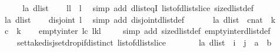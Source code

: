 \begin{isabellebody}
\isanewline
{}\isamarkupfalse%
%
\isadelimproof
\ %
\endisadelimproof
%
\isatagproof
{}\isamarkupfalse%
\isanewline
\ \ \isamarkupfalse%
\ l{\isacharcolon}{\isacharcolon}{\isachardoublequoteopen}{\isacharprime}a\ dlist{\isachardoublequoteclose}\isanewline
\ \ \isamarkupfalse%
\ {\isachardoublequoteopen}l{\isasymdagger}{}{\isachardot}{\isachardot}{\isacharparenleft}{\isacharhash}l{\isacharparenright}\ {\isacharequal}\ l{\isachardoublequoteclose}\ \isamarkupfalse%
\ {\isacharparenleft}simp\ add{\isacharcolon}\ dlist{\isacharunderscore}eqI\ list{\isacharunderscore}of{\isacharunderscore}dlist{\isacharunderscore}slice\ size{\isacharunderscore}dlist{\isacharunderscore}def{\isacharparenright}\ \isanewline
\ \ \isamarkupfalse%
\ l{\isacharcolon}{\isacharcolon}{\isachardoublequoteopen}{\isacharprime}a\ dlist{\isachardoublequoteclose}\isanewline
\ \ \isamarkupfalse%
\ {\isachardoublequoteopen}disjoint\ l{\isachardoublequoteclose}\ \isamarkupfalse%
\ {\isacharparenleft}simp\ add{\isacharcolon}\ disjoint{\isacharunderscore}dlist{\isacharunderscore}def{\isacharparenright}\isanewline
\ \ \isamarkupfalse%
\isanewline
\ \ \isamarkupfalse%
\ l{\isacharcolon}{\isacharcolon}{\isachardoublequoteopen}{\isacharprime}a\ dlist{\isachardoublequoteclose}\ \ c{\isacharcolon}{\isacharcolon}nat\ \ k\isanewline
\ \ \isamarkupfalse%
\ {\isachardoublequoteopen}c\ {\isasymle}\ k{\isachardoublequoteclose}\isanewline
\ \ \isamarkupfalse%
\ {\isachardoublequoteopen}empty{\isacharunderscore}inter\ {\isacharparenleft}l{\isasymdagger}{}{\isachardot}{\isachardot}c{\isacharparenright}\ {\isacharparenleft}l{\isasymdagger}k{\isachardot}{\isachardot}{\isacharparenleft}{\isacharhash}l{\isacharparenright}{\isacharparenright}{\isachardoublequoteclose}\ \isanewline
\ \ \isamarkupfalse%
\ {\isacharparenleft}simp\ add{\isacharcolon}\ size{\isacharunderscore}dlist{\isacharunderscore}def\ empty{\isacharunderscore}inter{\isacharunderscore}dlist{\isacharunderscore}def\ \isanewline
\ \ \ \ set{\isacharunderscore}take{\isacharunderscore}disj{\isacharunderscore}set{\isacharunderscore}drop{\isacharunderscore}if{\isacharunderscore}distinct\ list{\isacharunderscore}of{\isacharunderscore}dlist{\isacharunderscore}slice\ {\isacharparenright}\isanewline
\ \ \isamarkupfalse%
\isanewline
\ \ \isamarkupfalse%
\ l{\isacharcolon}{\isacharcolon}{\isachardoublequoteopen}{\isacharprime}a\ dlist{\isachardoublequoteclose}\ \ i\ \ j\ \ a\ \ b\ \isanewline

\end{isabellebody}
